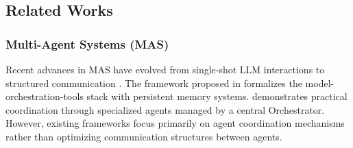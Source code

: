 \subsection{Related Works}\label{appendix_related_works}

\subsubsection{Multi-Agent Systems (MAS)}
Recent advances in MAS have evolved from single-shot LLM interactions to structured communication \cite{zhao2023survey}. The framework proposed in \cite{google2024agents_whitepaper, googadk2025} formalizes the model-orchestration-tools stack with persistent memory systems.
\cite{magenticone2024} demonstrates practical coordination through specialized agents 
managed by a central Orchestrator. 
However, existing frameworks focus primarily on agent coordination mechanisms rather than optimizing communication structures between agents.

